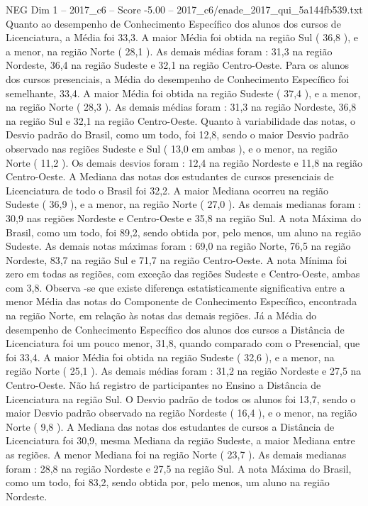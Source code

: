 \begin{textsample}{NEG Dim 1 – 2017\_c6 – Score -5.00 – 2017\_c6/enade\_2017\_qui\_5a144fb539.txt}
Quanto ao desempenho de Conhecimento Específico dos alunos dos cursos de Licenciatura, a Média foi 33,3.
A maior Média foi obtida na região Sul ( 36,8 ), e a menor, na região Norte ( 28,1 ).
As demais médias foram : 31,3 na região Nordeste, 36,4 na região Sudeste e 32,1 na região Centro-Oeste.
Para os alunos dos cursos presenciais, a Média do desempenho de Conhecimento Específico foi semelhante, 33,4.
A maior Média foi obtida na região Sudeste ( 37,4 ), e a menor, na região Norte ( 28,3 ).
As demais médias foram : 31,3 na região Nordeste, 36,8 na região Sul e 32,1 na região Centro-Oeste.
Quanto à variabilidade das notas, o Desvio padrão do Brasil, como um todo, foi 12,8, sendo o maior Desvio padrão observado nas regiões Sudeste e Sul ( 13,0 em ambas ), e o menor, na região Norte ( 11,2 ).
Os demais desvios foram : 12,4 na região Nordeste e 11,8 na região Centro-Oeste.
A Mediana das notas dos estudantes de cursos presenciais de Licenciatura de todo o Brasil foi 32,2.
A maior Mediana ocorreu na região Sudeste ( 36,9 ), e a menor, na região Norte ( 27,0 ).
As demais medianas foram : 30,9 nas regiões Nordeste e Centro-Oeste e 35,8 na região Sul.
A nota Máxima do Brasil, como um todo, foi 89,2, sendo obtida por, pelo menos, um aluno na região Sudeste.
As demais notas máximas foram : 69,0 na região Norte, 76,5 na região Nordeste, 83,7 na região Sul e 71,7 na região Centro-Oeste.
A nota Mínima foi zero em todas as regiões, com exceção das regiões Sudeste e Centro-Oeste, ambas com 3,8.
Observa -se que existe diferença estatisticamente significativa entre a menor Média das notas do Componente de Conhecimento Específico, encontrada na região Norte, em relação às notas das demais regiões.
Já a Média do desempenho de Conhecimento Específico dos alunos dos cursos a Distância de Licenciatura foi um pouco menor, 31,8, quando comparado com o Presencial, que foi 33,4.
A maior Média foi obtida na região Sudeste ( 32,6 ), e a menor, na região Norte ( 25,1 ).
As demais médias foram : 31,2 na região Nordeste e 27,5 na Centro-Oeste.
Não há registro de participantes no Ensino a Distância de Licenciatura na região Sul.
O Desvio padrão de todos os alunos foi 13,7, sendo o maior Desvio padrão observado na região Nordeste ( 16,4 ), e o menor, na região Norte ( 9,8 ).
A Mediana das notas dos estudantes de cursos a Distância de Licenciatura foi 30,9, mesma Mediana da região Sudeste, a maior Mediana entre as regiões.
A menor Mediana foi na região Norte ( 23,7 ).
As demais medianas foram : 28,8 na região Nordeste e 27,5 na região Sul.
A nota Máxima do Brasil, como um todo, foi 83,2, sendo obtida por, pelo menos, um aluno na região Nordeste.

\end{textsample}
